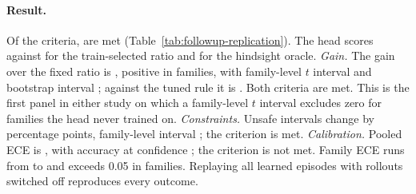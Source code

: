 \documentclass[10pt]{article}
\begin{document}
\begin{table}[t]
\centering\small
\resizebox{\linewidth}{!}{}
\caption{Registered replication of the frozen broadened-run models on \TypedRepFamilies{} families drawn from the stated population (\TypedRepTraceSeeds{} trace seeds each, \TypedModelSeeds{} model seeds). The family bootstrap resamples families, traces within each drawn family and model seeds; the $t$ interval is over the family-level mean differences. Rows below the rule are secondary and carry no criterion.}\label{tab:followup-replication}
\end{table}

\paragraph{Result.}
Of the \TypedRepCriteria{} criteria, \TypedRepCriteriaMet{} are met (Table~\ref{tab:followup-replication}). The head scores \TypedRepHeadUtility{} against \TypedRepBaseUtility{} for the train-selected ratio and \TypedRepOracleUtility{} for the hindsight oracle. \emph{Gain.} The gain over the fixed ratio is \TypedRepGain{}, positive in \TypedRepGainPositive{} families, with family-level $t$ interval \TypedRepGainT{} and bootstrap interval \TypedRepGainFamily{}; against the tuned rule it is \TypedRepGainVsRule{} \TypedRepGainVsRuleT{}. Both criteria are met. This is the first panel in either study on which a family-level $t$ interval excludes zero for families the head never trained on. \emph{Constraints.} Unsafe intervals change by \TypedRepUnsafe{} percentage points, family-level interval \TypedRepUnsafeFamily{}; the criterion is met. \emph{Calibration.} Pooled ECE is \TypedRepEce{}, with accuracy \TypedRepAccuracy{} at confidence \TypedRepConfidence{}; the criterion is not met. Family ECE runs from \TypedRepEceBest{} to \TypedRepEceWorst{} and exceeds 0.05 in \TypedRepEceAbove{} families. Replaying all \TypedRepIsolationEpisodes{} learned episodes with rollouts switched off reproduces every outcome.
\end{document}
